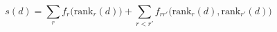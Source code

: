 \[
s(d)=\sum_{r} f_r\big(\mathrm{rank}_r(d)\big)+\sum_{r<r'} f_{rr'}\big(\mathrm{rank}_r(d),\mathrm{rank}_{r'}(d)\big)
\]
